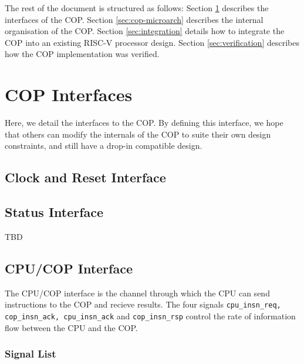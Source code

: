 \documentclass{article}
\begin{document}
The rest of the document is structured as follows: Section 
\ref{sec:cop-interfaces} describes the interfaces of the COP. Section
\ref{sec:cop-microarch} describes the internal organisation of the COP.
Section \ref{sec:integration} details how to integrate the COP into an
existing RISC-V processor design. Section \ref{sec:verification} describes
how the COP implementation was verified.

\section{COP Interfaces}
\label{sec:cop-interfaces}

Here, we detail the interfaces to the COP. By defining this interface, we
hope that others can modify the internals of the COP to suite their own
design constraints, and still have a drop-in compatible design.

\subsection{Clock and Reset Interface}
\label{sec:if-clk-reset}


\subsection{Status Interface}

TBD

\subsection{CPU/COP Interface}
\label{sec:cpu-cop-if}

The CPU/COP interface is the channel through which the CPU can send
instructions to the COP and recieve results.
The four signals
{\tt cpu\_insn\_req, cop\_insn\_ack, cpu\_insn\_ack} and
{\tt cop\_insn\_rsp}
control the rate of information flow between the CPU and the COP.

\subsubsection{Signal List}
\end{document}
